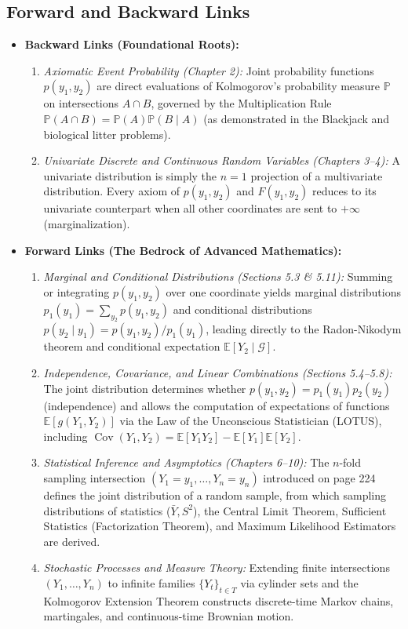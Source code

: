 \documentclass[11pt, letterpaper]{article}
\theoremstyle{definition}
\theoremstyle{remark}
\newcommand{\E}{\mathbb{E}}
\newcommand{\Prob}{\mathbb{P}}
\begin{document}
\subsection{Forward and Backward Links}

\begin{itemize}
    \item \textbf{Backward Links (Foundational Roots):}
    \begin{enumerate}[label=\arabic*.]
        \item \emph{Axiomatic Event Probability (Chapter 2):} Joint probability functions $p(y_1, y_2)$ are direct evaluations of Kolmogorov's probability measure $\Prob$ on intersections $A \cap B$, governed by the Multiplication Rule $\Prob(A \cap B) = \Prob(A)\Prob(B \mid A)$ (as demonstrated in the Blackjack and biological litter problems).
        \item \emph{Univariate Discrete and Continuous Random Variables (Chapters 3--4):} A univariate distribution is simply the $n = 1$ projection of a multivariate distribution. Every axiom of $p(y_1, y_2)$ and $F(y_1, y_2)$ reduces to its univariate counterpart when all other coordinates are sent to $+\infty$ (marginalization).
    \end{enumerate}
    \item \textbf{Forward Links (The Bedrock of Advanced Mathematics):}
    \begin{enumerate}[label=\arabic*.]
        \item \emph{Marginal and Conditional Distributions (Sections 5.3 \& 5.11):} Summing or integrating $p(y_1, y_2)$ over one coordinate yields marginal distributions $p_1(y_1) = \sum_{y_2} p(y_1, y_2)$ and conditional distributions $p(y_2 \mid y_1) = p(y_1, y_2)/p_1(y_1)$, leading directly to the Radon-Nikodym theorem and conditional expectation $\E[Y_2 \mid \mathcal{G}]$.
        \item \emph{Independence, Covariance, and Linear Combinations (Sections 5.4--5.8):} The joint distribution determines whether $p(y_1, y_2) = p_1(y_1)p_2(y_2)$ (independence) and allows the computation of expectations of functions $\E[g(Y_1, Y_2)]$ via the Law of the Unconscious Statistician (LOTUS), including $\operatorname{Cov}(Y_1, Y_2) = \E[Y_1 Y_2] - \E[Y_1]\E[Y_2]$.
        \item \emph{Statistical Inference and Asymptotics (Chapters 6--10):} The $n$-fold sampling intersection $(Y_1 = y_1, \dots, Y_n = y_n)$ introduced on page 224 defines the joint distribution of a random sample, from which sampling distributions of statistics ($\bar{Y}, S^2$), the Central Limit Theorem, Sufficient Statistics (Factorization Theorem), and Maximum Likelihood Estimators are derived.
        \item \emph{Stochastic Processes and Measure Theory:} Extending finite intersections $(Y_1, \dots, Y_n)$ to infinite families $\{Y_t\}_{t \in T}$ via cylinder sets and the Kolmogorov Extension Theorem constructs discrete-time Markov chains, martingales, and continuous-time Brownian motion.
    \end{enumerate}
\end{itemize}
\end{document}
